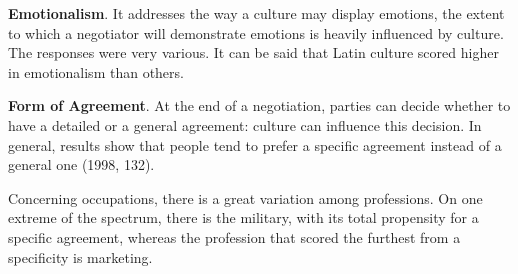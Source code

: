\documentclass[../main.tex]{subfiles}
\begin{document}
\textbf{Emotionalism}. It addresses the way a culture may display emotions, the extent to which a negotiator will demonstrate emotions is heavily influenced by culture. The responses were very various. It can be said that Latin culture scored higher in emotionalism than others.

\vspace{0.3cm}
\begin{minipage}{\linewidth}
    \label{emotionalismPerCountry.}
\end{minipage}
\vspace{0.3cm}

\textbf{Form of Agreement}. At the end of a negotiation, parties can decide whether to have a detailed or a general agreement: culture can influence this decision. In general, results show that people tend to prefer a specific agreement instead of a general one (1998, 132). 

\vspace{0.3cm}
\begin{minipage}{\linewidth}
    \label{formAgreementPerCountry}
\end{minipage}
\vspace{0.3cm}

Concerning occupations, there is a great variation among professions. On one extreme of the spectrum, there is the military, with its total propensity for a specific agreement, whereas the profession that scored the furthest from a specificity is marketing.

\vspace{0.3cm}
\begin{minipage}{\linewidth}
    \label{formAgreementPerProfession}
\end{minipage}
\vspace{0.3cm}
\end{document}
